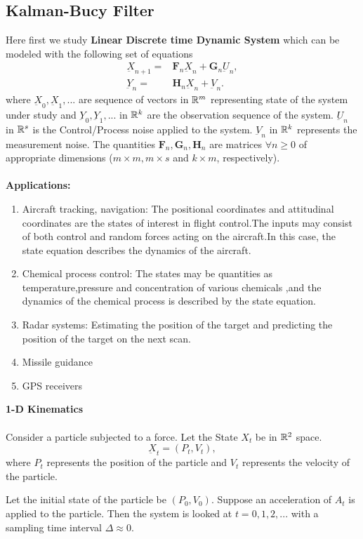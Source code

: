 \documentclass[a4paper,english,12pt]{article}
\begin{document}
\subsection{Kalman-Bucy Filter}
Here first we study \textbf{Linear Discrete time Dynamic System} which can be modeled with the following set of equations 
\begin{align}
  \underbar{X}_{n+1}=&\textbf{F}_n\underbar{X}_n+\textbf{G}_n\underbar{U}_n,\\
   \underbar{Y}_n=&\textbf{H}_n\underbar{X}_n+\underbar{V}_n.
\end{align}
where $\underbar{X}_0,\underbar{X}_1,...$  are sequence of vectors in $\mathbb{R}^m$ representing  state of the system under study and $\underbar{Y}_0,\underbar{Y}_1,.. .$ in $\mathbb{R}^k$ are the observation sequence  of the system. $\underbar{U}_n$ in $\mathbb{R}^s$ is the Control/Process noise applied to the system. $\underbar{V}_n$ in $\mathbb{R}^k$ represents the measurement noise. The quantities $\textbf{F}_n,\textbf{G}_n,\textbf{H}_n$ are matrices $\forall n \geq 0$ of appropriate dimensions ($m\times m,m\times s$ and $k\times m$, respectively).\\\\
\textbf{Applications:}
\begin{enumerate}
    \item Aircraft tracking, navigation: The positional coordinates and attitudinal coordinates are the states of interest in flight control.The inputs may consist of both control and random forces acting on the aircraft.In this case, the state equation describes the dynamics of the aircraft.
    \item Chemical process control: The states may be quantities as temperature,pressure and concentration of various chemicals ,and the dynamics of the chemical process is described by the state equation. 
    \item Radar systems: Estimating the position of the target and predicting the position of the target on the next scan.
    \item Missile guidance
    \item GPS receivers
\end{enumerate}
\begin{exmp}\textbf{1-D Kinematics}\\
\\Consider a particle subjected to a force. Let the State $X_t$ be in $\mathbb{R}^2$  space. 
\begin{equation}
    \underbar{X}_t=(P_t,V_t),
\end{equation}
where $P_t$ represents the position of the particle and $V_t$ represents the velocity of the particle.
\par Let the initial state of the particle be $(P_0,V_0)$.
Suppose an acceleration of $A_t$ is applied to the particle. Then the system is looked at $t=0,1,2,...$ with a sampling time interval $\Delta\approx0$.
\end{exmp}
\end{document}
